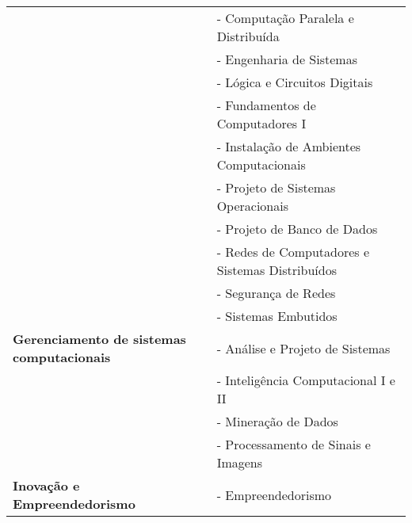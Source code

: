 \begin{table}[ht]
\begin{tabular}{l l}
                                & - Computação Paralela e Distribuída                    \\

                                & - Engenharia de Sistemas                               \\

                                & - Lógica e Circuitos Digitais                          \\

                                & - Fundamentos de Computadores I                        \\

                                & - Instalação de Ambientes Computacionais               \\

                                & - Projeto de Sistemas Operacionais                     \\

                                & - Projeto de Banco de Dados                            \\

                                & - Redes de Computadores e Sistemas Distribuídos        \\

                                & - Segurança de Redes                                   \\

                                & - Sistemas Embutidos                                   \\

        \hline

        \textbf{Gerenciamento de sistemas computacionais}
                                & - Análise e Projeto de Sistemas                        \\

                                & - Inteligência Computacional I e II                    \\

                                & - Mineração de Dados                                   \\

                                & - Processamento de Sinais e Imagens                    \\

        \hline

        \textbf{Inovação e Empreendedorismo }
                                & - Empreendedorismo                                     \\


\end{tabular}
\end{table}
